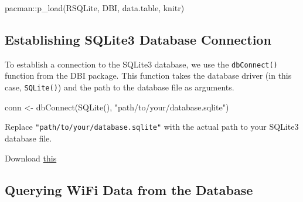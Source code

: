 \documentclass[
  letterpaper,
]{scrbook}
\newenvironment{Shaded}{\begin{snugshade}}{\end{snugshade}}
\newcommand{\FunctionTok}[1]{\textcolor[rgb]{0.28,0.35,0.67}{#1}}
\newcommand{\NormalTok}[1]{\textcolor[rgb]{0.00,0.23,0.31}{#1}}
\newcommand{\OtherTok}[1]{\textcolor[rgb]{0.00,0.23,0.31}{#1}}
\newcommand{\SpecialCharTok}[1]{\textcolor[rgb]{0.37,0.37,0.37}{#1}}
\newcommand{\StringTok}[1]{\textcolor[rgb]{0.13,0.47,0.30}{#1}}
\begin{document}
\begin{Shaded}
\begin{Highlighting}[]
\NormalTok{pacman}\SpecialCharTok{::}\FunctionTok{p\_load}\NormalTok{(RSQLite, DBI, data.table, knitr)}
\end{Highlighting}
\end{Shaded}

\hypertarget{establishing-sqlite3-database-connection}{%
\subsection{Establishing SQLite3 Database
Connection}\label{establishing-sqlite3-database-connection}}

To establish a connection to the SQLite3 database, we use the
\texttt{dbConnect()} function from the DBI package. This function takes
the database driver (in this case, \texttt{SQLite()}) and the path to
the database file as arguments.

\begin{Shaded}
\begin{Highlighting}[]
\NormalTok{conn }\OtherTok{\textless{}{-}} \FunctionTok{dbConnect}\NormalTok{(}\FunctionTok{SQLite}\NormalTok{(), }\StringTok{"path/to/your/database.sqlite"}\NormalTok{)}
\end{Highlighting}
\end{Shaded}

Replace \texttt{"path/to/your/database.sqlite"} with the actual path to
your SQLite3 database file.

\begin{tcolorbox}[enhanced jigsaw, bottomrule=.15mm, opacitybacktitle=0.6, toprule=.15mm, colback=white, colbacktitle=quarto-callout-note-color!10!white, left=2mm, colframe=quarto-callout-note-color-frame, coltitle=black, title=\textcolor{quarto-callout-note-color}{\faInfo}\hspace{0.5em}{If you don't have the WiFi DB}, opacityback=0, breakable, bottomtitle=1mm, toptitle=1mm, titlerule=0mm, arc=.35mm, leftrule=.75mm, rightrule=.15mm]

Download \href{material/ch3/sample.sqlite3}{this}

\end{tcolorbox}

\hypertarget{querying-wifi-data-from-the-database}{%
\subsection{Querying WiFi Data from the
Database}\label{querying-wifi-data-from-the-database}}
\end{document}
